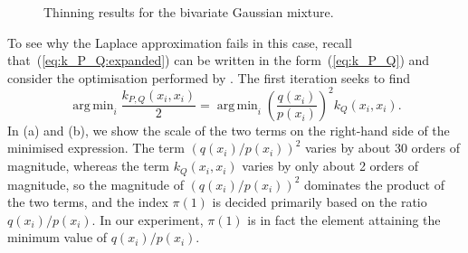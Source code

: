\documentclass[11pt,a4paper]{report}
\DeclareMathOperator*{\argmin}{arg\,min}
\begin{document}
\begin{figure}[t]
\centering
{}
\caption{Thinning results for the bivariate Gaussian mixture.
\label{fig:gmm:thinned}}
\end{figure}

To see why the Laplace approximation fails in this case, recall that~(\ref{eq:k_P_Q:expanded}) can be written in the form~(\ref{eq:k_P_Q}) and consider the optimisation performed by . The first iteration seeks to find
\begin{equation*}
\argmin_i \frac{k_{P,Q}(x_i, x_i)}{2} = \argmin_i \left(\frac{q(x_i)}{p(x_i)}\right)^2 k_Q(x_i, x_i).
\end{equation*}
In (a) and (b), we show the scale of the two terms on the right-hand side of the minimised expression. The term $(q(x_i) / p(x_i))^2$ varies by about 30 orders of magnitude, whereas the term $k_Q(x_i, x_i)$ varies by only about 2 orders of magnitude, so the magnitude of $(q(x_i) / p(x_i))^2$ dominates the product of the two terms, and the index $\pi(1)$ is decided primarily based on the ratio $q(x_i) / p(x_i)$. In our experiment, $\pi(1)$ is in fact the element attaining the minimum value of $q(x_i) / p(x_i)$.
\end{document}
